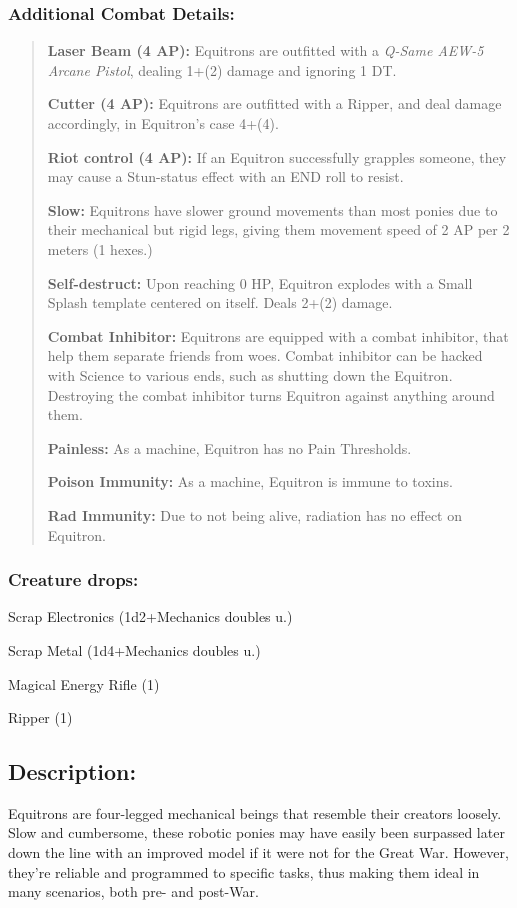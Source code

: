 \documentclass[11pt,a4paper,twocolumn]{book}
\begin{document}
	\subsubsection*{Additional Combat Details:}
	\begin{verse}
		\textbf{Laser Beam (4 AP):} Equitrons are outfitted with a \emph{Q-Same AEW-5 Arcane Pistol}, dealing 1+(2) damage and ignoring 1 DT.
		
		\textbf{Cutter (4 AP):} Equitrons are outfitted with a Ripper, and deal damage accordingly, in Equitron's case 4+(4).
		
		\textbf{Riot control (4 AP):} If an Equitron successfully grapples someone, they may cause a Stun-status effect with an END roll to resist.
		
		\textbf{Slow:} Equitrons have slower ground movements than most ponies due to their mechanical but rigid legs, giving them movement speed of 2 AP per 2 meters (1 hexes.)
		
		\textbf{Self-destruct:} Upon reaching 0 HP, Equitron explodes with a Small Splash template centered on itself. Deals 2+(2) damage.
		
		\textbf{Combat Inhibitor:} Equitrons are equipped with a combat inhibitor, that help them separate friends from woes. Combat inhibitor can be hacked with Science to various ends, such as shutting down the Equitron. Destroying the combat inhibitor turns Equitron against anything around them. 
		
		\textbf{Painless:} As a machine, Equitron has no Pain Thresholds.
		
		\textbf{Poison Immunity:} As a machine, Equitron is immune to toxins.
		
		\textbf{Rad Immunity:} Due to not being alive, radiation has no effect on Equitron.
	\end{verse}
	
	\subsubsection*{Creature drops:}
	\begin{compactitem}
		\item Scrap Electronics (1d2+Mechanics doubles u.)
		\item Scrap Metal (1d4+Mechanics doubles u.)
		\item Magical Energy Rifle (1)
		\item Ripper (1)
	\end{compactitem}
	
	\subsection*{Description:}
	Equitrons are four-legged mechanical beings that resemble their creators loosely. Slow and cumbersome, these robotic ponies may have easily been surpassed later down the line with an improved model if it were not for the Great War. However, they're reliable and programmed to specific tasks, thus making them ideal in many scenarios, both pre- and post-War.
	
\end{document}
